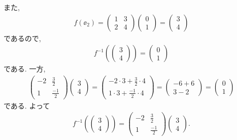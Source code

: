\begin{checkanswer}
  また,
  \begin{align*}
    f(\ee_2)=\begin{pmatrix}1&3\\2&4\end{pmatrix}\begin{pmatrix}0\\1\end{pmatrix}
      =\begin{pmatrix}3\\4\end{pmatrix}
  \end{align*}
  であるので,
  \begin{align*}
    f^{-1}(\begin{pmatrix}3\\4\end{pmatrix})=\begin{pmatrix}0\\1\end{pmatrix}
  \end{align*}
  である. 一方,
  \begin{align*}
    \begin{pmatrix}-2&\frac{3}{2}\\1&\frac{-1}{2}\end{pmatrix}\begin{pmatrix}3\\4\end{pmatrix}
      =
      \begin{pmatrix}-2\cdot 3+\frac{3}{2}\cdot 4\\1\cdot 3+\frac{-1}{2}\cdot 4\end{pmatrix}
      =
      \begin{pmatrix}-6+6\\3-2\end{pmatrix}
      =
      \begin{pmatrix}0\\1\end{pmatrix}
  \end{align*}
  である.  よって
  \begin{align*}
    f^{-1}(\begin{pmatrix}3\\4\end{pmatrix})=
      \begin{pmatrix}-2&\frac{3}{2}\\1&\frac{-1}{2}\end{pmatrix}\begin{pmatrix}3\\4\end{pmatrix}.
  \end{align*}
  
\end{checkanswer}


